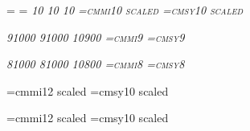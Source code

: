 \begin{\parsearg\beginxxx}
\newcount\mainmagstep
\ifx\bigger\relax
  \mainmagstep=
  \setfont\textrm{}
  \setfont\texttt{}
\else
  \mainmagstep=\magstephalf
  \setfont\textrm{}
  \setfont\texttt{}
\fi
\setfont\textbf{}
\setfont\textit\itshape{10}{\mainmagstep}
\setfont\textsl\slshape{10}{\mainmagstep}
\setfont\textsf{}
\setfont\textsc\scshape{10}{\mainmagstep}
\setfont\textttsl{}
\font\texti=cmmi10 scaled \mainmagstep
\font\textsy=cmsy10 scaled \mainmagstep

\setfont{} %
\setfont{}
\def\df{\let\tentt=\deftt \let\tenbf = \defbf \bf}

\setfont\smallrm{}
\setfont\smalltt{}
\setfont\smallbf{}
\setfont\smallit\itshape{9}{1000}
\setfont\smallsl\slshape{9}{1000}
\setfont\smallsf{}
\setfont\smallsc\scshape{10}{900}
\setfont\smallttsl{}
\font\smalli=cmmi9
\font\smallsy=cmsy9

\setfont\smallerrm{}
\setfont\smallertt{}
\setfont\smallerbf{}
\setfont\smallerit\itshape{8}{1000}
\setfont\smallersl\slshape{8}{1000}
\setfont\smallersf{}
\setfont\smallersc\scshape{10}{800}
\setfont\smallerttsl{}
\font\smalleri=cmmi8
\font\smallersy=cmsy8

\setfont\titlerm{}
\setfont\titleit{}
\setfont\titlesl{}
\setfont\titlett{}
\setfont\titlettsl{}
\setfont\titlesf{}
\let\titlebf=\titlerm
\setfont\titlesc{}
\font\titlei=cmmi12 scaled 
\font\titlesy=cmsy10 scaled 
\def\authorrm{\secrm}
\def\authortt{\sectt}

\setfont\chaprm{}
\setfont\chapit{}
\setfont\chapsl{}
\setfont\chaptt{}
\setfont\chapttsl{}
\setfont\chapsf{}
\let\chapbf=\chaprm
\setfont\chapsc{}
\font\chapi=cmmi12 scaled 
\font\chapsy=cmsy10 scaled 


\end{\parsearg\beginxxx}

